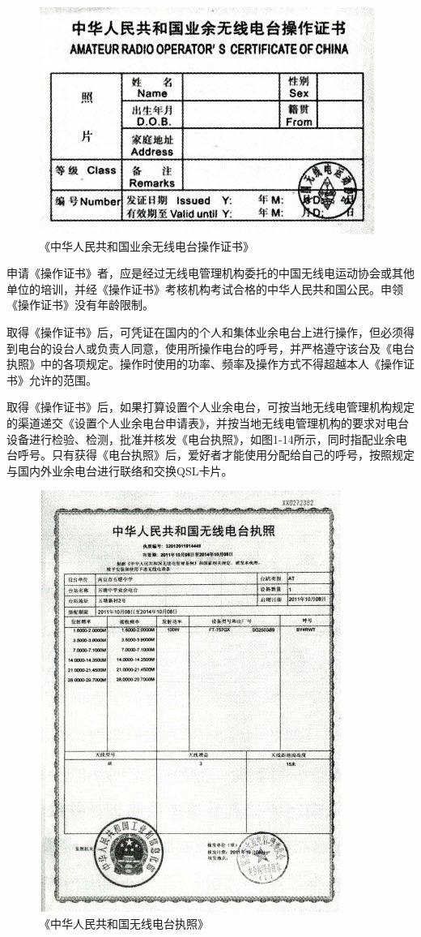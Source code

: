 \documentclass[12pt,UTF8]{ctexbook}
\begin{document}
\begin{figure}[htbp]
	\centering
	\includegraphics[width=0.7\linewidth]{13}
	\caption{《中华人民共和国业余无线电台操作证书》}
	\label{fig:1}
\end{figure}

申请《操作证书》者，应是经过无线电管理机构委托的中国无线电运动协会或其他单位的培训，并经《操作证书》考核机构考试合格的中华人民共和国公民。申领《操作证书》没有年龄限制。

取得《操作证书》后，可凭证在国内的个人和集体业余电台上进行操作，但必须得到电台的设台人或负责人同意，使用所操作电台的呼号，并严格遵守该台及《电台执照》中的各项规定。操作时使用的功率、频率及操作方式不得超越本人《操作证书》允许的范围。

取得《操作证书》后，如果打算设置个人业余电台，可按当地无线电管理机构规定的渠道递交《设置个人业余电台申请表》，并按当地无线电管理机构的要求对电台设备进行检验、检测，批准并核发《电台执照》，如图1-14所示，同时指配业余电台呼号。只有获得《电台执照》后，爱好者才能使用分配给自己的呼号，按照规定与国内外业余电台进行联络和交换QSL卡片。

\begin{figure}[htbp]
	\centering
	\includegraphics[width=0.7\linewidth]{14}
	\caption{《中华人民共和国无线电台执照》}
	\label{fig:1}
\end{figure}
\end{document}
